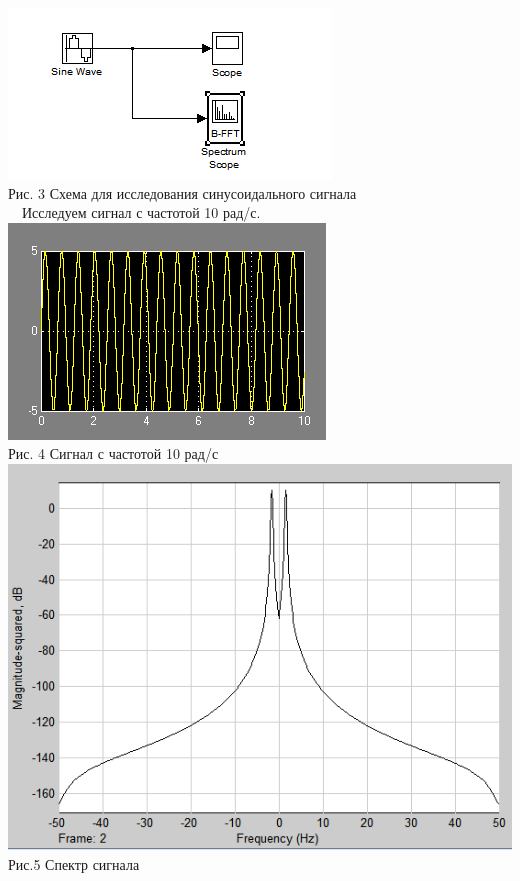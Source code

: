 \documentclass[a4paper]{article}
\begin{document}
\center\includegraphics[scale = 1]{scheme1.png} \\ Рис. 3 Схема для исследования синусоидального сигнала \\

~\
\flushleft Исследуем сигнал с частотой 10 рад/с.
\center\includegraphics[scale = 1]{sin_sim1.png} \\ Рис. 4 Сигнал с частотой 10 рад/с \\ 
\center\includegraphics[scale = 0.7]{sin_sim_spectrum1.png} \\ Рис.5 Спектр сигнала \\
\end{document}
